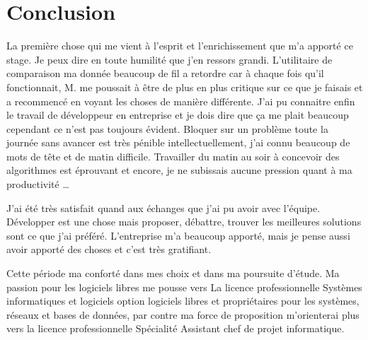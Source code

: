 \chapter{Conclusion}

La première chose qui me vient à l'esprit et l'enrichissement que m'a apporté
ce stage. Je peux dire en toute humilité que j'en ressors grandi. L'utilitaire
de comparaison ma donnée beaucoup de fil a retordre car à chaque fois qu'il
fonctionnait, M. me poussait à être de plus en plus critique sur
ce que je faisais et a recommencé en voyant les choses de manière différente.
J'ai pu connaitre enfin le travail de développeur en entreprise et je dois dire
que ça me plait beaucoup cependant ce n'est pas toujours évident. Bloquer sur
un problème toute la journée sans avancer est très pénible intellectuellement,
j'ai connu beaucoup de mots de tête et de matin difficile. Travailler du matin
au soir à concevoir des algorithmes est éprouvant et encore, je ne subissais
aucune pression quant à ma productivité \ldots{}

J'ai été très satisfait quand aux échanges que j'ai pu avoir avec l'équipe.
Développer est une chose mais proposer, débattre, trouver les meilleures
solutions sont ce que j'ai préféré. L'entreprise m'a beaucoup apporté, mais je
pense aussi avoir apporté des choses et c'est très gratifiant.

Cette période ma conforté dans mes choix et dans ma poursuite d'étude. Ma
passion pour les logiciels libres me pousse vers La licence professionnelle
Systèmes informatiques et logiciels option logiciels libres et propriétaires
pour les systèmes, réseaux et bases de données, par contre ma force de
proposition m'orienterai plus vers la licence professionnelle Spécialité
Assistant chef de projet informatique.
